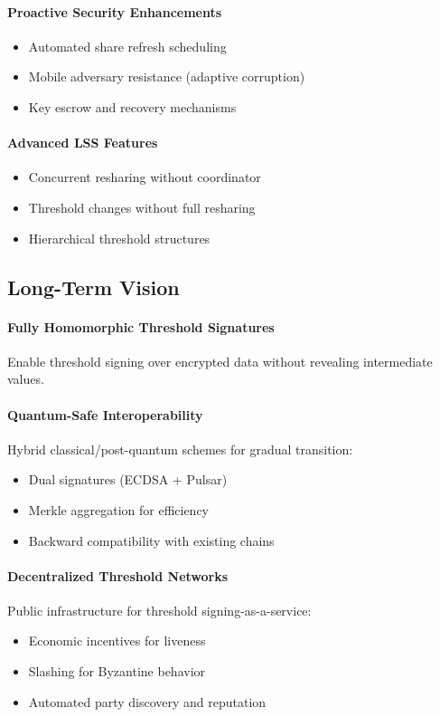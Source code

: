 \paragraph{Proactive Security Enhancements}
\begin{itemize}
\item Automated share refresh scheduling
\item Mobile adversary resistance (adaptive corruption)
\item Key escrow and recovery mechanisms
\end{itemize}

\paragraph{Advanced LSS Features}
\begin{itemize}
\item Concurrent resharing without coordinator
\item Threshold changes without full resharing
\item Hierarchical threshold structures
\end{itemize}

\subsection{Long-Term Vision}

\paragraph{Fully Homomorphic Threshold Signatures} Enable threshold signing over encrypted data without revealing intermediate values.

\paragraph{Quantum-Safe Interoperability} Hybrid classical/post-quantum schemes for gradual transition:
\begin{itemize}
\item Dual signatures (ECDSA + Pulsar)
\item Merkle aggregation for efficiency
\item Backward compatibility with existing chains
\end{itemize}

\paragraph{Decentralized Threshold Networks} Public infrastructure for threshold signing-as-a-service:
\begin{itemize}
\item Economic incentives for liveness
\item Slashing for Byzantine behavior
\item Automated party discovery and reputation
\end{itemize}

